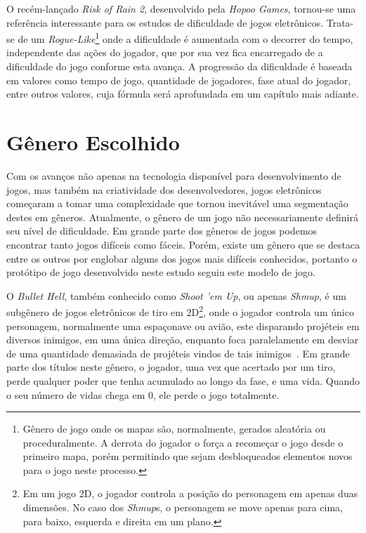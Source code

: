 O recém-lançado \textit{Risk of Rain 2}, desenvolvido pela \textit{Hopoo Games}, tornou-se uma referência interessante para os estudos de dificuldade de jogos eletrônicos. Trata-se de um \textit{Rogue-Like}\footnote{
    Gênero de jogo onde os mapas são, normalmente, gerados aleatória ou proceduralmente. A derrota do jogador o força a recomeçar o jogo desde o primeiro mapa, porém permitindo que sejam desbloqueados elementos novos para o jogo neste processo.
} onde a dificuldade é aumentada com o decorrer do tempo, independente das ações do jogador, que por sua vez fica encarregado de \textquotedbl{} a dificuldade do jogo conforme esta avança. A progressão da dificuldade é baseada em valores como tempo de jogo, quantidade de jogadores, fase atual do jogador, entre outros valores, cuja fórmula será aprofundada em um capítulo mais adiante.

\section{Gênero Escolhido}\label{genero}

Com os avanços não apenas na tecnologia disponível para desenvolvimento de jogos, mas também na criatividade dos desenvolvedores, jogos eletrônicos começaram a tomar uma complexidade que tornou inevitável uma segmentação destes em gêneros. Atualmente, o gênero de um jogo não necessariamente definirá seu nível de dificuldade. Em grande parte dos gêneros de jogos podemos encontrar tanto jogos difíceis como fáceis. Porém, existe um gênero que se destaca entre os outros por englobar alguns dos jogos mais difíceis conhecidos, portanto o protótipo de jogo desenvolvido neste estudo seguiu este modelo de jogo.

O \textit{Bullet Hell}, também conhecido como \textit{Shoot 'em Up}, ou apenas \textit{Shmup}, é um subgênero de jogos eletrônicos de tiro em 2D\footnote{
    Em um jogo 2D, o jogador controla a posição do personagem em apenas duas dimensões. No caso dos \textit{Shmup}s, o personagem se move apenas para cima, para baixo, esquerda e direita em um plano.
}, onde o jogador controla um único personagem, normalmente uma espaçonave ou avião, este disparando projéteis em diversos inimigos, em uma única direção, enquanto foca paralelamente em desviar de uma quantidade demasiada de projéteis vindos de tais inimigos~\citep{STG}. Em grande parte dos títulos neste gênero, o jogador, uma vez que acertado por um tiro, perde qualquer poder que tenha acumulado ao longo da fase, e uma vida. Quando o seu número de vidas chega em 0, ele perde o jogo totalmente.

